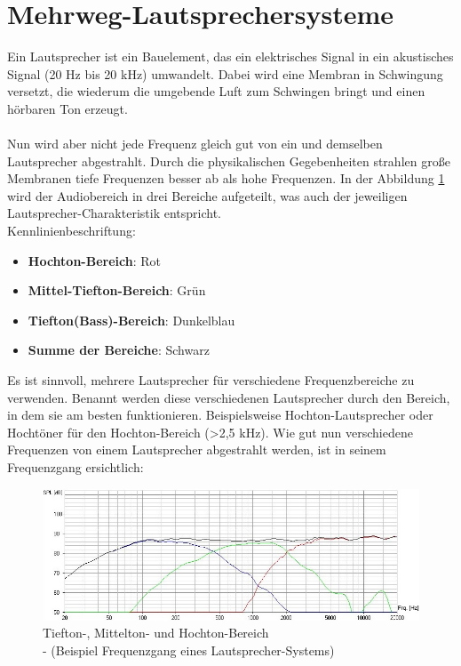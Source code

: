 \section{Mehrweg-Lautsprechersysteme}\label{sec:3.2}
Ein Lautsprecher ist ein Bauelement, das ein elektrisches Signal in ein akustisches Signal (20 Hz bis 20 kHz) umwandelt.
Dabei wird eine Membran in Schwingung versetzt, die wiederum die umgebende Luft zum Schwingen bringt und einen hörbaren Ton erzeugt.
\\ \\
Nun wird aber nicht jede Frequenz gleich gut von ein und demselben Lautsprecher abgestrahlt.
Durch die physikalischen Gegebenheiten strahlen große Membranen tiefe Frequenzen besser ab als hohe Frequenzen.
In der Abbildung \ref{fig:3.2.1} wird der Audiobereich in drei Bereiche aufgeteilt, was auch der jeweiligen Lautsprecher-Charakteristik entspricht.\\
Kennlinienbeschriftung:\\
\begin{itemize}
	\item \textbf{Hochton-Bereich}: Rot
	\item \textbf{Mittel-Tiefton-Bereich}: Grün
	\item \textbf{Tiefton(Bass)-Bereich}: Dunkelblau
	\item \textbf{Summe der Bereiche}: Schwarz	
\end{itemize}
Es ist sinnvoll, mehrere Lautsprecher für verschiedene Frequenzbereiche zu verwenden.
Benannt werden diese verschiedenen Lautsprecher durch den Bereich, in dem sie am besten funktionieren.
Beispielsweise Hochton-Lautsprecher oder Hochtöner für den Hochton-Bereich (>2,5 kHz).
Wie gut nun verschiedene Frequenzen von einem Lautsprecher abgestrahlt werden, ist in seinem Frequenzgang ersichtlich:
\begin{figure} [H]
	\centering
	\includegraphics[width=1\textwidth]{img/Grundlagen/Mehrweg-Lautsprechersysteme/Frequenzbereiche-Audio-cut.jpg}
	\caption{Tiefton-, Mittelton- und Hochton-Bereich\\- (Beispiel Frequenzgang eines Lautsprecher-Systems)}
	\label{fig:3.2.1}
\end{figure}

